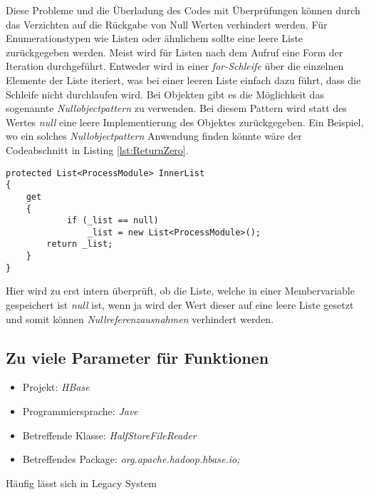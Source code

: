 \SuperPar Diese Probleme und die Überladung des Codes mit Überprüfungen können durch das Verzichten auf die Rückgabe von Null Werten verhindert werden. Für Enumerationstypen wie Listen oder ähnlichem sollte eine leere Liste zurückgegeben werden. Meist wird für Listen nach dem Aufruf eine Form der Iteration durchgeführt. Entweder wird in einer \textit{for-Schleife} über die einzelnen Elemente der Liste iteriert, was bei einer leeren Liste einfach dazu führt, dass die Schleife nicht durchlaufen wird. Bei Objekten gibt es die Möglichkeit das sogenannte \textit{Nullobjectpattern} zu verwenden. Bei diesem Pattern wird statt des Wertes \textit{null} eine leere Implementierung des Objektes zurückgegeben. Ein Beispiel, wo ein solches \textit{Nullobjectpattern} Anwendung finden könnte wäre der Codeabschnitt in Listing \ref{lst:ReturnZero}. 

\begin{lstlisting}[language={[Sharp]C}, caption=Beispiele für Rückgabe eines Null Wertes, label=lst:ReturnZero]
protected List<ProcessModule> InnerList
{
	get
	{
			if (_list == null)
				_list = new List<ProcessModule>();
		return _list;
	}
}
\end{lstlisting}

\SuperPar Hier wird zu erst intern überprüft, ob die Liste, welche in einer Membervariable gespeichert ist \textit{null} ist, wenn ja wird der Wert dieser auf eine leere Liste gesetzt und somit können \textit{Nullreferenzausnahmen} verhindert werden. 


\subsection{Zu viele Parameter für Funktionen}
\begin{itemize}
	\item Projekt: \textit{HBase}
	\item Programmiersprache: \textit{Jave}
	\item Betreffende Klasse: \textit{HalfStoreFileReader}
	\item Betreffendes Package: \textit{org.apache.hadoop.hbase.io;}
\end{itemize}

\SuperPar Häufig lässt sich in Legacy System
